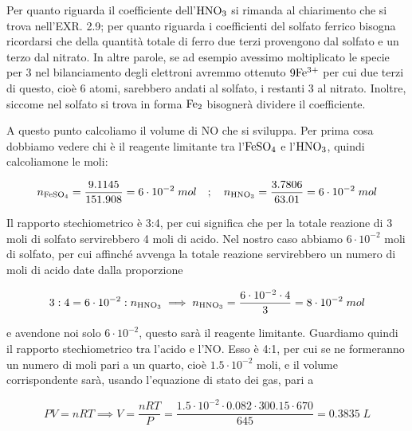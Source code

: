 Per quanto riguarda il coefficiente dell'$\rm HNO_3$ si rimanda al chiarimento che si trova nell'EXR. 2.9; per quanto riguarda i coefficienti del solfato ferrico bisogna ricordarsi che della quantità totale di ferro due terzi provengono dal solfato e un terzo dal nitrato. In altre parole, se ad esempio avessimo moltiplicato le specie per 3 nel bilanciamento degli elettroni avremmo ottenuto $\rm 9Fe^{3+}$ per cui due terzi di questo, cioè 6 atomi, sarebbero andati al solfato, i restanti 3 al nitrato. Inoltre, siccome nel solfato si trova in forma $\rm Fe_2$ bisognerà dividere il coefficiente.

A questo punto calcoliamo il volume di NO che si sviluppa. Per prima cosa dobbiamo vedere chi è il reagente limitante tra l'$\rm FeSO_4$ e l'$\rm HNO_3$, quindi calcoliamone le moli:

$$n_{\rm FeSO_4}=\frac{9.1145}{151.908}
=6 \cdot 10^{-2}\;mol
\quad;\quad
n_{\rm HNO_3}=\frac{3.7806}{63.01}
=6 \cdot 10^{-2}\;mol$$

Il rapporto stechiometrico è 3:4, per cui significa che per la totale reazione di 3 moli di solfato servirebbero 4 moli di acido. Nel nostro caso abbiamo $6 \cdot 10^{-2}$ moli di solfato, per cui affinché avvenga la totale reazione servirebbero un numero di moli di acido date dalla proporzione

$$3:4=6 \cdot 10^{-2}:n_{\rm HNO_3}
\implies
n_{\rm HNO_3}=\frac{6 \cdot 10^{-2} \cdot 4}{3}
=8 \cdot 10^{-2}\;mol$$

e avendone noi solo $6 \cdot 10^{-2}$, questo sarà il reagente limitante. Guardiamo quindi il rapporto stechiometrico tra l'acido e l'NO. Esso è 4:1, per cui se ne formeranno un numero di moli pari a un quarto, cioè $1.5 \cdot 10^{-2}$ moli, e il volume corrispondente sarà, usando l'equazione di stato dei gas, pari a 

$$PV=nRT
\implies
V=\frac{nRT}{P}
=\frac{1.5 \cdot 10^{-2} \cdot 0.082 \cdot 300.15 \cdot 670}{645}
=0.3835\;L$$